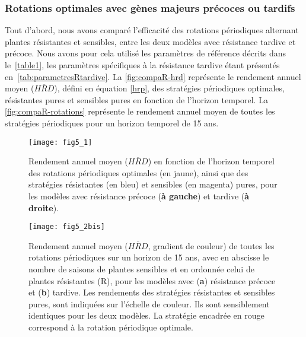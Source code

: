 \subsubsection{Rotations optimales avec gènes majeurs précoces ou tardifs}
	
	Tout d'abord, nous avons comparé l'efficacité des rotations périodiques alternant plantes résistantes et sensibles, entre les deux modèles avec résistance tardive et précoce. Nous avons pour cela utilisé les paramètres de référence décrits dans le~\autoref{table1}, les paramètres spécifiques à la résistance tardive étant présentés en~\autoref{tab:parametresRtardive}. La \autoref{fig:compaR-hrd} représente le rendement annuel moyen ($\overline{HRD}$), défini en équation  \eqref{hrp}, des stratégies périodiques optimales, résistantes pures et sensibles pures en fonction de l'horizon temporel. La \autoref{fig:compaR-rotations} représente le rendement annuel moyen  de toutes les stratégies périodiques pour un horizon temporel de 15 ans.
	
   \begin{figure}
	 \centering \texttt{[image: fig5\_1]}
	  \caption[Rendement annuel moyen en fonction de l'horizon temporel pour les modèles avec résistance précoce et 
	  tardive]{Rendement annuel moyen ($\overline{HRD}$) en fonction de l'horizon temporel des rotations périodiques 
	  optimales (en jaune), ainsi que des stratégies résistantes (en bleu) et sensibles (en magenta) pures,  pour les 
	  modèles avec résistance précoce (\textbf{à gauche}) et tardive (\textbf{à droite}).}
	  \label{fig:compaR-hrd}
   \end{figure}
	
   \begin{figure}
	 \centering
	  \texttt{[image: fig5\_2bis]}		
	  \caption[Rendement annuel moyen de toutes les rotations périodiques sur un horizon de 15 ans pour les modèles 
	  avec résistance précoce et tardive]{Rendement annuel moyen ($\overline{HRD}$, gradient de couleur) de toutes les 
	  rotations périodiques sur un horizon de 15 ans,  avec en abscisse le nombre de saisons de plantes sensibles et en 
	  ordonnée celui de plantes résistantes (R), pour les modèles avec (\textbf{a}) résistance précoce  et (\textbf{b}) 
	  tardive. Les rendements des stratégies résistantes et sensibles pures, sont indiquées sur l'échelle de couleur. 
	  Ils sont sensiblement identiques pour les deux modèles. La stratégie encadrée en rouge correspond à la rotation 
	  périodique optimale.}
	  \label{fig:compaR-rotations}
   \end{figure}
	
